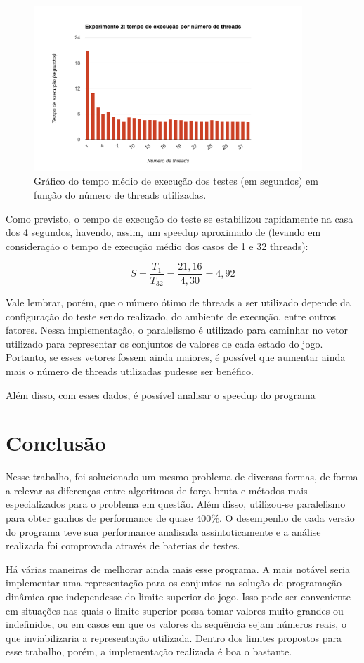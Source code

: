 \documentclass[10pt,a4paper]{article}
\numberwithin{equation}{section}
\begin{document}
\begin{figure}[H]
\begin{mdframed}
    \centering
    \includegraphics[width=0.90\textwidth]{graphics/exp2.pdf}
    \caption{Gráfico do tempo médio de execução dos testes (em segundos) em função do número de threads utilizadas.}
    \label{fig:experimento2}
\end{mdframed}
\end{figure}

Como previsto, o tempo de execução do teste se estabilizou rapidamente na casa dos 4 segundos, havendo, assim, um speedup aproximado de (levando em consideração o tempo de execução médio dos casos de 1 e 32 threads):

\[
    S = \frac{T_1}{T_32} = \frac{21,16}{4,30} = 4,92
\]

Vale lembrar, porém, que o número ótimo de threads a ser utilizado depende da configuração do teste sendo realizado, do ambiente de execução, entre outros fatores. Nessa implementação, o paralelismo é utilizado para caminhar no vetor utilizado para representar os conjuntos de valores de cada estado do jogo. Portanto, se esses vetores fossem ainda maiores, é possível que aumentar ainda mais o número de threads utilizadas pudesse ser benéfico.

Além disso, com esses dados, é possível analisar o speedup do programa 


\section{Conclusão}

Nesse trabalho, foi solucionado um mesmo problema de diversas formas, de forma a relevar as diferenças entre algoritmos de força bruta e métodos mais especializados para o problema em questão. Além disso, utilizou-se paralelismo para obter ganhos de performance de quase $400\%$. O desempenho de cada versão do programa teve sua performance analisada assintoticamente e a análise realizada foi comprovada através de baterias de testes.

Há várias maneiras de melhorar ainda mais esse programa. A mais notável seria implementar uma representação para os conjuntos na solução de programação dinâmica que independesse do limite superior do jogo. Isso pode ser conveniente em situações nas quais o limite superior possa tomar valores muito grandes ou indefinidos, ou em casos em que os valores da sequência sejam números reais, o que inviabilizaria a representação utilizada. Dentro dos limites propostos para esse trabalho, porém, a implementação realizada é boa o bastante.
\end{document}
